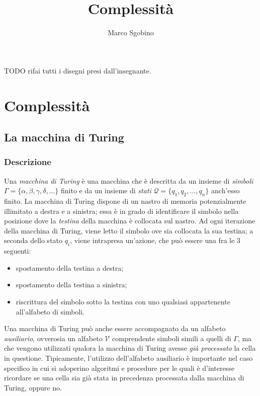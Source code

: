 \documentclass[10pt]{book}
\begin{document}
TODO rifai tutti i disegni presi dall'insegnante.
\setmonofont[Scale=.85]{Fira Code Retina}

\title{Complessità}
\author{Marco Sgobino}
\maketitle
\tableofcontents

\part{Complessità}
\chapter{La macchina di Turing}
\section{Descrizione}

Una \emph{macchina di Turing} è una macchina che è descritta da un insieme di
\emph{simboli} $\Gamma = \{\alpha, \beta, \gamma, \delta, \dots\}$ finito e da
un insieme di \emph{stati} $\mathcal{Q} = \{q_1, q_2, \dots, q_n\}$ anch'esso
finito. La macchina di Turing dispone di un nastro di memoria potenzialmente
illimitato a destra e a sinistra; essa è in grado di identificare il simbolo
nella posizione dove la \emph{testina} della macchina è collocata sul nastro.
Ad ogni iterazione della macchina di Turing, viene letto il simbolo
ove sia collocata la sua testina; a seconda dello stato $q_i$, viene intrapresa
un'azione, che può essere una fra le $3$ seguenti:
\begin{itemize}
    \item spostamento della testina a destra;
    \item spostamento della testina a sinistra;
    \item riscrittura del simbolo sotto la testina con uno qualsiasi
        appartenente all'alfabeto di simboli.
\end{itemize}

Una macchina di Turing può anche essere accompagnato da un alfabeto
\emph{ausiliario}, ovverosia un alfabeto $\mathcal V$ comprendente simboli
simili a quelli di $\Gamma$, ma che vengono utilizzati qualora la macchina di
Turing avesse \emph{già processato} la cella in questione. Tipicamente,
l'utilizzo dell'alfabeto ausiliario è importante nel caso specifico in cui si
adoperino algoritmi e procedure per le quali è d'interesse ricordare se una
cella sia già stata in precedenza processata dalla macchina di Turing, oppure
no.
\end{document}
